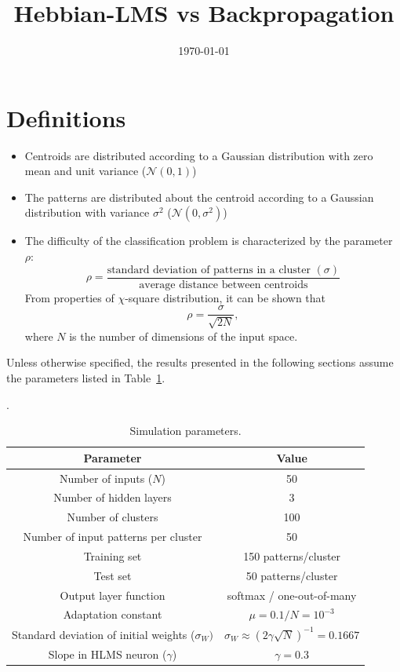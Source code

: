 \documentclass[a4paper, 10pt]{article}
\title{Hebbian-LMS vs Backpropagation}
\date{\today}
\begin{document}
\maketitle

\section*{Definitions}

\begin{itemize}
	\item Centroids are distributed according to a Gaussian distribution with zero mean and unit variance ($\mathcal{N}(0, 1)$)
	\item The patterns are distributed about the centroid according to a Gaussian distribution with variance $\sigma^2$ ($\mathcal{N}(0, \sigma^2)$)
	\item The difficulty of the classification problem is characterized by the parameter $\rho$:
	\begin{equation}
	\rho = \frac{\text{standard deviation of patterns in a cluster } (\sigma)}{\text{average distance between centroids}} 
	\end{equation}
	From properties of $\chi$-square distribution, it can be shown that 
	\begin{equation}
	\rho = \frac{\sigma}{\sqrt{2N}},
	\end{equation} 
	where $N$ is the number of dimensions of the input space.
\end{itemize}

Unless otherwise specified, the results presented in the following sections assume the parameters listed in Table~\ref{tab:param}.

\begin{table}[!h]
	\centering
	\caption{Simulation parameters.} \label{tab:param}.
	\begin{tabular}{c|c}
		\hline
		Parameter & Value \\
		\hline
		Number of inputs ($N$) & 50 \\
		Number of hidden layers & 3 \\
		Number of clusters & 100 \\
		Number of input patterns per cluster & 50 \\
		Training set & 150 patterns/cluster \\
		Test set & 50 patterns/cluster \\		 
		Output layer function & softmax / one-out-of-many \\
		Adaptation constant & $\mu = 0.1/N = 10^{-3}$ \\
		Standard deviation of initial weights ($\sigma_W)$ & $\sigma_W \approx (2\gamma\sqrt{N})^{-1} = 0.1667$ \\
		Slope in HLMS neuron ($\gamma$) & $\gamma = 0.3$ \\
		\hline
	\end{tabular}
\end{table}
\end{document}
